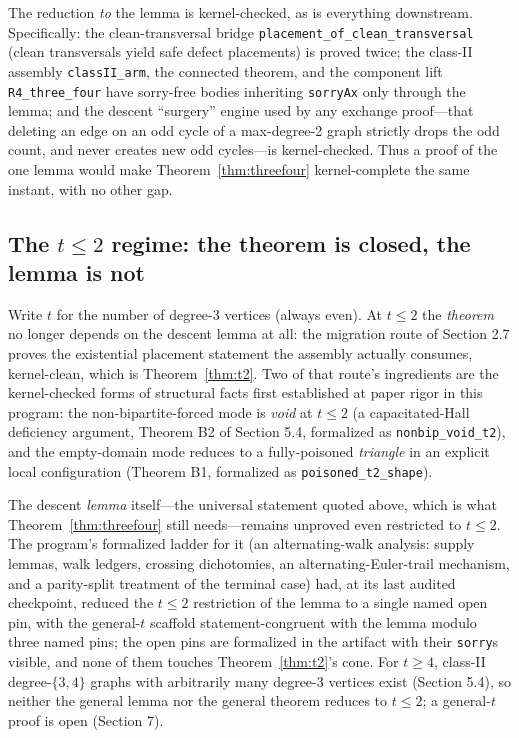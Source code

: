 \documentclass[11pt]{article}
\theoremstyle{definition}
\theoremstyle{remark}
\begin{document}
The reduction \emph{to} the lemma is kernel-checked, as is everything downstream. Specifically: the clean-transversal bridge \texttt{placement\_of\_clean\_transversal} (clean transversals yield safe defect placements) is proved twice; the class-II assembly \texttt{classII\_arm}, the connected theorem, and the component lift \texttt{R4\_three\_four} have sorry-free bodies inheriting \texttt{sorryAx} only through the lemma; and the descent ``surgery'' engine used by any exchange proof---that deleting an edge on an odd cycle of a max-degree-2 graph strictly drops the odd count, and never creates new odd cycles---is kernel-checked. Thus a proof of the one lemma would make Theorem~\ref{thm:threefour} kernel-complete the same instant, with no other gap.

\subsection{The $t \le 2$ regime: the theorem is closed, the lemma is not}\label{53-t2}

Write $t$ for the number of degree-3 vertices (always even). At $t \le 2$ the \emph{theorem} no longer depends on the descent lemma at all: the migration route of Section 2.7 proves the existential placement statement the assembly actually consumes, kernel-clean, which is Theorem~\ref{thm:t2}. Two of that route's ingredients are the kernel-checked forms of structural facts first established at paper rigor in this program: the non-bipartite-forced mode is \emph{void} at $t \le 2$ (a capacitated-Hall deficiency argument, Theorem B2 of Section 5.4, formalized as \texttt{nonbip\_void\_t2}), and the empty-domain mode reduces to a fully-poisoned \emph{triangle} in an explicit local configuration (Theorem B1, formalized as \texttt{poisoned\_t2\_shape}).

The descent \emph{lemma} itself---the universal statement quoted above, which is what Theorem~\ref{thm:threefour} still needs---remains unproved even restricted to $t \le 2$. The program's formalized ladder for it (an alternating-walk analysis: supply lemmas, walk ledgers, crossing dichotomies, an alternating-Euler-trail mechanism, and a parity-split treatment of the terminal case) had, at its last audited checkpoint, reduced the $t \le 2$ restriction of the lemma to a single named open pin, with the general-$t$ scaffold statement-congruent with the lemma modulo three named pins; the open pins are formalized in the artifact with their \texttt{sorry}s visible, and none of them touches Theorem~\ref{thm:t2}'s cone. For $t \ge 4$, class-II degree-$\{3,4\}$ graphs with arbitrarily many degree-3 vertices exist (Section 5.4), so neither the general lemma nor the general theorem reduces to $t \le 2$; a general-$t$ proof is open (Section 7).
\end{document}

